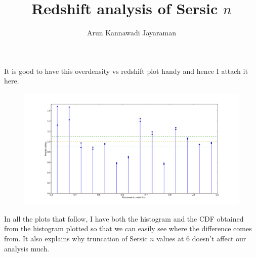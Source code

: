 \documentclass[a4paper,10pt]{article}
\title{Redshift analysis of Sersic $n$}
\author{Arun Kannawadi Jayaraman}
\begin{document}
\maketitle

It is good to have this overdensity vs redshift plot handy and hence I attach it here. \\

\begin{figure}
 \centering
  \includegraphics[scale=0.25]{overdensities.png}
\end{figure}

In all the plots that follow, I have both the histogram and the CDF obtained from the histogram plotted so that we can easily see where the difference comes from.
It also explains why truncation of Sersic $n$ values at 6 doesn't affect our analysis much.

\pagebreak
\end{document}
